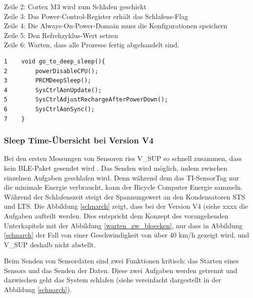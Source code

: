 Zeile 2:\hspace{1cm}   Cortex M3 wird zum Schlafen geschickt\\
Zeile 3:\hspace{1cm}   Das Power-Control-Register erhält das Schlafens-Flag\\
Zeile 4:\hspace{1cm}   Die Always-On-Power-Domain muss die Konfigurationen speichern\\
Zeile 5:\hspace{1cm}   Den Refrehzyklus-Wert setzen\\
Zeile 6:\hspace{1cm}   Warten, dass alle Prozesse fertig abgehandelt sind.\\

\begin{minipage}[t]{1\textwidth}
\small\begin{verbatim}
1    void go_to_deep_sleep(){ 
2        powerDisableCPU();
3        PRCMDeepSleep();
4        SysCtrlAonUpdate();
5        SysCtrlAdjustRechargeAfterPowerDown();
6        SysCtrlAonSync();
7    }
\end{verbatim}\normalsize
\end{minipage}

\subsubsection{Sleep Time-Übersicht bei Version V4}
	    
Bei den ersten Messungen von Sensoren riss V\_SUP so schnell zusammen, dass kein BLE-Paket gesendet wird . Das Senden wird möglich, indem zwischen einzelnen Aufgaben geschlafen wird. Denn während dem das TI-SensorTag nur die minimale Energie verbraucht, kann der Bicycle Computer Energie sammeln. Während der Schlafenszeit steigt der Spannungswert an den Kondensatoren STS und LTS. Die Abbildung \ref{schnarch} zeigt, dass bei der Version V4 (siehe xxxx  die Aufgaben aufteilt werden. Dies entspricht dem Konzept des vorangehenden Unterkapitels mit der Abbildung \ref{warten_zw_bloecken}, nur dass in Abbildung \ref{schnarch} der Fall von einer Geschwindigkeit von über 40 km/h  gezeigt wird, und V\_SUP deshalb nicht abstellt.   

Beim Senden von Sensordaten sind zwei Funktionen kritisch: das Starten eines Sensors und das Senden der Daten. Diese zwei Aufgaben werden getrennt und dazwischen geht das System schlafen (siehe vereinfacht dargestellt in der Abbildung \ref{schnarch}).

